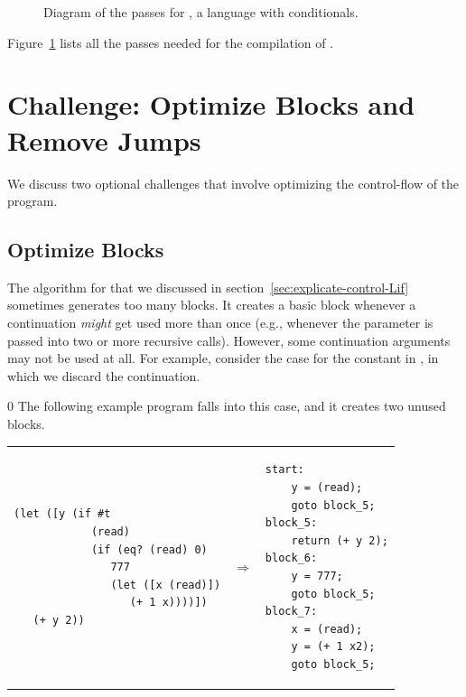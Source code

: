 \documentclass[7x10]{TimesAPriori_MIT}%
\def\racketEd{0}
\def\edition{0}
\numberwithin{theorem}{chapter}
\numberwithin{definition}{chapter}
\numberwithin{equation}{chapter}
\begin{document}
\begin{figure}[tbp]
\caption{Diagram of the passes for \LangIf{}, a language with conditionals.}
 \label{fig:Lif-passes}
\end{figure}

Figure~\ref{fig:Lif-passes} lists all the passes needed for the
compilation of \LangIf{}.


\section{Challenge: Optimize Blocks and Remove Jumps}
\label{sec:opt-jumps}

We discuss two optional challenges that involve optimizing the
control-flow of the program.

\subsection{Optimize Blocks}

The algorithm for  that we discussed in
section~\ref{sec:explicate-control-Lif} sometimes generates too many
blocks. It creates a basic block whenever a continuation \emph{might}
get used more than once (e.g., whenever the  parameter is
passed into two or more recursive calls). However, some continuation
arguments may not be used at all. For example, consider the case for
the constant \TRUE{} in , in which we discard the
 continuation.
%
 {\if\edition\racketEd
The following example program falls into this
case, and it creates two unused blocks.       
\begin{center}
\begin{tabular}{lll}
\begin{minipage}{0.4\textwidth}
\begin{lstlisting}
(let ([y (if #t
            (read)
            (if (eq? (read) 0)
               777
               (let ([x (read)])
                  (+ 1 x))))])
   (+ y 2))
\end{lstlisting}
\end{minipage}
&
$\Rightarrow$
&
\begin{minipage}{0.55\textwidth}
\begin{lstlisting}
start:
    y = (read);
    goto block_5;
block_5:
    return (+ y 2);
block_6:
    y = 777;
    goto block_5;
block_7:
    x = (read);
    y = (+ 1 x2);
    goto block_5;
\end{lstlisting}
\end{minipage}
\end{tabular} 
\end{center}
\fi}
\end{document}

